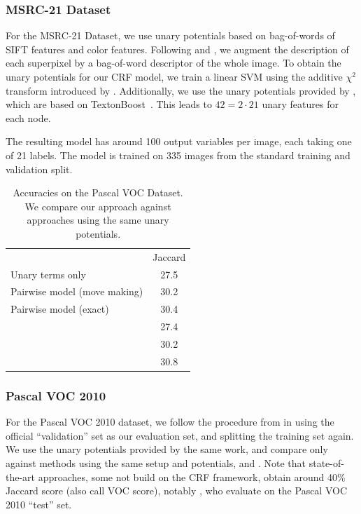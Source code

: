 \subsubsection{MSRC-21 Dataset}
For the MSRC-21 Dataset, we use unary potentials based on bag-of-words of SIFT
features and color features.  Following \citet{lucchi2011spatial} and
\citet{fulkerson2009class}, we augment the description of each superpixel by a
bag-of-word descriptor of the whole image. To obtain the unary potentials for
our CRF model, we train a linear SVM using the additive $\chi^2$ transform
introduced by \citet{vedaldi2010efficient}. Additionally, we use the unary
potentials provided by \citet{krahenbuhl2012efficient}, which are based on
TextonBoost~\citep{shotton2006textonboost}. This leads to $42 = 2 \cdot 21$
unary features for each node.

The resulting model has around 100 output variables per image, each taking one of 21
labels. The model is trained on 335 images from the standard training and
validation split.

\begin{table}
    \begin{center}
    \begin{tabularx}{\linewidth}{@{\extracolsep{\fill}}lc}
        \toprule
                    & Jaccard \\
        \cmidrule{1-2}
    Unary terms only &  27.5 \\
    Pairwise model (move making)& 30.2\\
    Pairwise model (exact) & 30.4\\
        \cmidrule{1-2}
    \citet{dann2012pottics} & 27.4\\
    \citet{krahenbuhl2012efficient} & 30.2\\
    \citet{krahenbuhlparameter} & 30.8\\
    \bottomrule
    \end{tabularx}
    \end{center}
    \caption{Accuracies on the Pascal VOC Dataset. We compare our approach
    against approaches using the same unary potentials.\label{pascalacc}}
    
\end{table}


\subsubsection{Pascal VOC 2010}
For the Pascal VOC 2010 dataset, we follow the procedure from \citet{krahenbuhl2012efficient}
in using the official ``validation'' set as our evaluation set, and splitting the training set again.
We use the unary potentials provided by the same work, and compare only against methods
using the same setup and potentials, \citet{krahenbuhlparameter} and \citet{dann2012pottics}.
Note that state-of-the-art approaches, some not build on the CRF framework, obtain
around 40\% Jaccard score (also call VOC score), notably \cite{xia2012segmentation}, who 
evaluate on the Pascal VOC 2010 ``test'' set.


